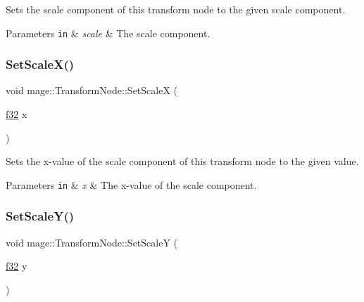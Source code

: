 Sets the scale component of this transform node to the given scale component.


\begin{DoxyParams}[1]{Parameters}
\mbox{\tt in}  & {\em scale} & The scale component. \\
\hline
\end{DoxyParams}
\hypertarget{structmage_1_1_transform_node_a02e925b95719497e34f42d94075e2fc2}{}\label{structmage_1_1_transform_node_a02e925b95719497e34f42d94075e2fc2} 
\subsubsection{\texorpdfstring{Set\+Scale\+X()}{SetScaleX()}}
{\footnotesize\ttfamily void mage\+::\+Transform\+Node\+::\+Set\+ScaleX (\begin{DoxyParamCaption}\item[{\hyperlink{namespacemage_a6a44ad388483959dc4dff9f2aef91431}{f32}}]{x }\end{DoxyParamCaption})\hspace{0.3cm}{\ttfamily [noexcept]}}

Sets the x-\/value of the scale component of this transform node to the given value.


\begin{DoxyParams}[1]{Parameters}
\mbox{\tt in}  & {\em x} & The x-\/value of the scale component. \\
\hline
\end{DoxyParams}
\hypertarget{structmage_1_1_transform_node_a16901f924368102c0c8fef0646cb46c9}{}\label{structmage_1_1_transform_node_a16901f924368102c0c8fef0646cb46c9} 
\subsubsection{\texorpdfstring{Set\+Scale\+Y()}{SetScaleY()}}
{\footnotesize\ttfamily void mage\+::\+Transform\+Node\+::\+Set\+ScaleY (\begin{DoxyParamCaption}\item[{\hyperlink{namespacemage_a6a44ad388483959dc4dff9f2aef91431}{f32}}]{y }\end{DoxyParamCaption})\hspace{0.3cm}{\ttfamily [noexcept]}}

